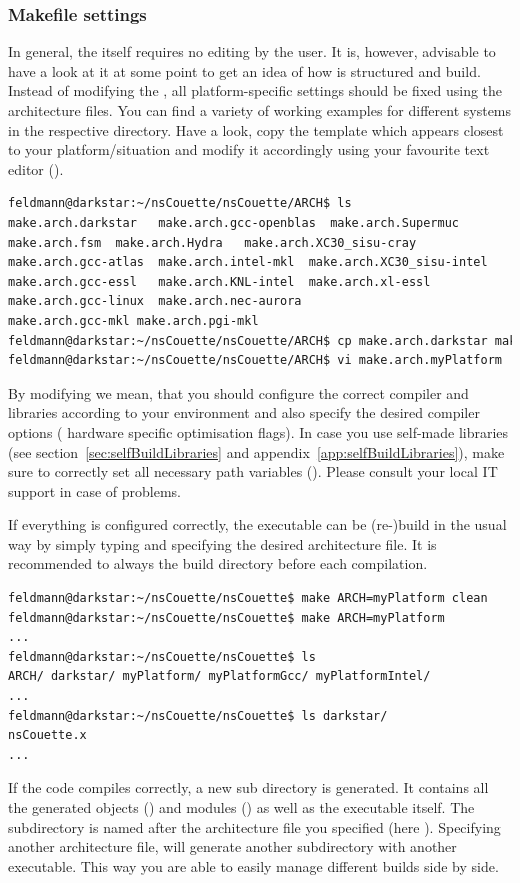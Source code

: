 \documentclass[a4paper, 11pt, DIV=11]{scrartcl}
\begin{document}
\subsubsection{Makefile settings}
\label{sec:makefile}

In general, the  itself requires no editing by the user.
It is, however, advisable to have a look at it at some point to get an
idea of how \nsc is structured and build. Instead of modifying the
, all platform-specific settings should be fixed using
the architecture files. You can find a variety of working examples for
different systems in the respective directory. Have a look, copy the
template which appears closest to your platform/situation and modify it
accordingly using your favourite text editor (\eg {}).
\begin{lstlisting}[language=bash]
feldmann@darkstar:~/nsCouette/nsCouette/ARCH$ ls
make.arch.darkstar   make.arch.gcc-openblas  make.arch.Supermuc
make.arch.fsm  make.arch.Hydra   make.arch.XC30_sisu-cray
make.arch.gcc-atlas  make.arch.intel-mkl  make.arch.XC30_sisu-intel
make.arch.gcc-essl   make.arch.KNL-intel  make.arch.xl-essl
make.arch.gcc-linux  make.arch.nec-aurora
make.arch.gcc-mkl make.arch.pgi-mkl
feldmann@darkstar:~/nsCouette/nsCouette/ARCH$ cp make.arch.darkstar make.arch.myPlatform
feldmann@darkstar:~/nsCouette/nsCouette/ARCH$ vi make.arch.myPlatform
\end{lstlisting}
By modifying we mean, that you should configure the correct compiler and libraries
according to your environment and also specify the desired compiler options (\eg
hardware specific optimisation flags). In case you use self-made libraries (see
section~\ref{sec:selfBuildLibraries} and appendix~\ref{app:selfBuildLibraries}),
make sure to correctly set all necessary path variables (\eg {}).
Please consult your local IT support in case of problems.
\par
If everything is configured correctly, the executable can be (re-)build in the usual way by
simply typing  and specifying the desired architecture file. It is recommended
to always  the build directory before each compilation.
\begin{lstlisting}[language=bash]
feldmann@darkstar:~/nsCouette/nsCouette$ make ARCH=myPlatform clean
feldmann@darkstar:~/nsCouette/nsCouette$ make ARCH=myPlatform
...
feldmann@darkstar:~/nsCouette/nsCouette$ ls
ARCH/ darkstar/ myPlatform/ myPlatformGcc/ myPlatformIntel/
...
feldmann@darkstar:~/nsCouette/nsCouette$ ls darkstar/
nsCouette.x
...
\end{lstlisting}
If the code compiles correctly, a new sub directory is generated. It contains all the
generated objects () and modules () as well as the executable
 itself. The subdirectory is named after the architecture file you
specified (here \eg {}). Specifying another architecture file, will
generate another subdirectory with another executable. This way you are able to easily
manage different builds side by side.
\end{document}
